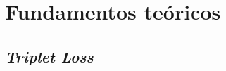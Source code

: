 \chapter{Fundamentos teóricos} \label{ich:fundamentos_teoricos}

\section{\textit{Triplet Loss}} \label{isec:triplet_loss}
